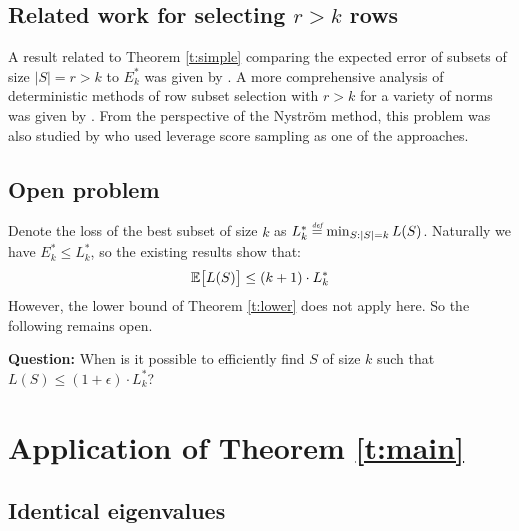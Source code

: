 \documentclass[12pt]{sty/colt2019/colt2018-arxiv}
\begin{document}
\subsection{Related work for selecting $r>k$ rows}

A result related to Theorem \ref{t:simple} comparing the expected
error of subsets of size $|S|=r>k$ to $E_k^*$ was given by
\cite{more-efficient-volume-sampling}. A more comprehensive analysis
of deterministic methods of row subset selection with $r>k$ for a variety of
norms was given by \cite{near-optimal-columns}. From the perspective
of the Nystr\"om method, this problem was also studied by
\cite{revisiting-nystrom} who used leverage score sampling as one of
the approaches.



\subsection{Open problem}
Denote the loss of the best subset of size $k$ as $L_k^* \stackrel{\textit{\tiny{def}}}{=}
\min_{S:|S|=k} L(S)$. Naturally we have $E_k^*\leq L_k^*$, so the
existing results show that:
\begin{align*}
  \mathbb E\big[L(S)\big] \leq (k+1)\cdot L_k^*
\end{align*}
However, the lower bound of Theorem \ref{t:lower} does not apply
here. So  the following remains open.

\textbf{Question:} When is it possible to efficiently find $S$ of size
$k$ such that $L(S)\leq (1+\epsilon)\cdot L_k^*$? 

\section{Application of Theorem \ref{t:main}}

\subsection{Identical eigenvalues}
\end{document}
